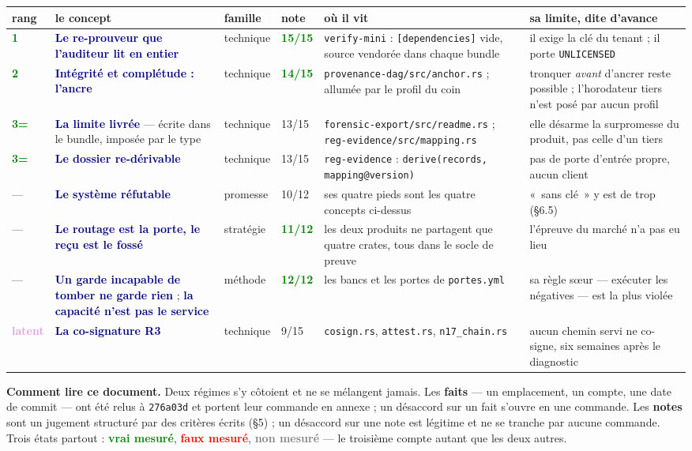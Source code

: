 \documentclass[10pt]{article}
\newcommand{\best}[1]{\textcolor{green}{\textbf{#1}}}
\newcommand{\code}[1]{\texttt{\small #1}}
\newcommand{\mm}[1]{\textbf{\textcolor{navy}{#1}}}
\newcommand{\ok}[1]{\textcolor{green}{\textbf{#1}}}
\newcommand{\ko}[1]{\textcolor{red}{\textbf{#1}}}
\newcommand{\lat}[1]{\textcolor{plum}{\textbf{#1}}}
\newcommand{\nm}[1]{\textcolor{grey}{\textbf{#1}}}
\begin{document}
{\small
\renewcommand{\arraystretch}{1.22}
\begin{longtable}{@{}L{0.95cm}L{4.05cm}L{1.45cm}L{1.0cm}L{4.0cm}L{4.6cm}@{}}
\toprule
\textbf{rang} & \textbf{le concept} & \textbf{famille} & \textbf{note} & \textbf{où il vit} & \textbf{sa limite, dite d'avance} \\ \midrule \endhead
\best{1} & \mm{Le re-prouveur que l'auditeur lit en entier} & technique & \best{15/15} & \code{verify-mini} : \code{[dependencies]} vide, source vendorée dans chaque bundle & il exige la clé du tenant ; il porte \code{UNLICENSED} \\
\best{2} & \mm{Intégrité et complétude : l'ancre} & technique & \best{14/15} & \code{provenance-dag/\allowbreak src/\allowbreak anchor.rs} ; allumée par le profil du coin & tronquer \emph{avant} d'ancrer reste possible ; l'horodateur tiers n'est posé par aucun profil \\
\best{3=} & \mm{La limite livrée} --- écrite dans le bundle, imposée par le type & technique & 13/15 & \code{forensic-export/\allowbreak src/\allowbreak readme.rs} ; \code{reg-evidence/\allowbreak src/\allowbreak mapping.rs} & elle désarme la surpromesse du produit, pas celle d'un tiers \\
\best{3=} & \mm{Le dossier re-dérivable} & technique & 13/15 & \code{reg-evidence} : \code{derive(records, mapping@version)} & pas de porte d'entrée propre, aucun client \\
--- & \mm{Le système réfutable} & promesse & 10/12 & ses quatre pieds sont les quatre concepts ci-dessus & «~sans clé~» y est de trop (§6.5) \\
--- & \mm{Le routage est la porte, le reçu est le fossé} & stratégie & \best{11/12} & les deux produits ne partagent que quatre crates, tous dans le socle de preuve & l'épreuve du marché n'a pas eu lieu \\
--- & \mm{Un garde incapable de tomber ne garde rien} ; \mm{la capacité n'est pas le service} & méthode & \best{12/12} & les bancs et les portes de \code{portes.yml} & sa règle sœur --- exécuter les négatives --- est la plus violée \\
\lat{latent} & \mm{La co-signature R3} & technique & 9/15 & \code{cosign.rs}, \code{attest.rs}, \code{n17\_chain.rs} & aucun chemin servi ne co-signe, six semaines après le diagnostic \\
\bottomrule
\end{longtable}
}

\textbf{Comment lire ce document.} Deux régimes s'y côtoient et ne se mélangent jamais. Les \textbf{faits} --- un
emplacement, un compte, une date de commit --- ont été relus à \code{276a03d} et portent leur commande en annexe ;
un désaccord sur un fait s'ouvre en une commande. Les \textbf{notes} sont un jugement structuré par des critères
écrits (§5) ; un désaccord sur une note est légitime et ne se tranche par aucune commande. Trois états partout :
\ok{vrai mesuré}, \ko{faux mesuré}, \nm{non mesuré} --- le troisième compte autant que les deux autres.
\end{document}
